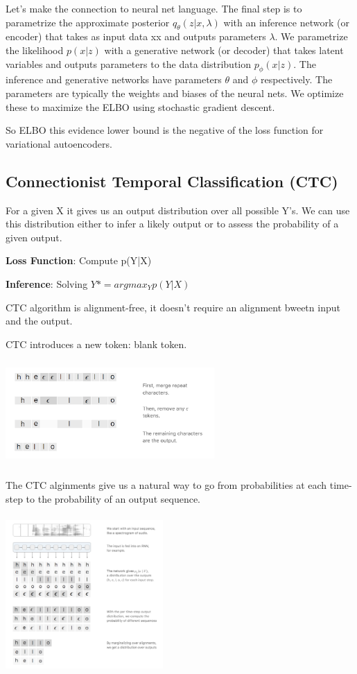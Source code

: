 \documentclass[a4paper]{article}
\begin{document}
Let’s make the connection to neural net language. The final step is to parametrize the approximate posterior $q_\theta (z | x, \lambda)$
 with an inference network (or encoder) that takes as input data xx and outputs parameters $\lambda$. We parametrize the likelihood $p(x |z)$ with a generative network (or decoder) that takes latent variables and outputs parameters to the data distribution $p_\phi(x|z)$. The inference and generative networks have parameters $\theta$ and $\phi$ respectively. The parameters are typically the weights and biases of the neural nets. We optimize these to maximize the ELBO using stochastic gradient descent.
 
 So ELBO this evidence lower bound is the negative of the loss function for variational autoencoders.

\subsection{Connectionist Temporal Classification (CTC)}

For a given X it gives us an output distribution over all possible Y's. We can use this distribution either to infer a likely output or to assess the probability of a given output.

{\bf Loss Function}: Compute p(Y|X)

{\bf Inference}: Solving $Y* = argmax_Y p(Y|X)$

CTC algorithm is alignment-free, it doesn't require an alignment bweetn input and the output. 

CTC introduces a new token: blank token. 

\begin{center}
\includegraphics[width=8cm, height=4cm]{blank.png}
\end{center}

The CTC alginments give us a natural way to go from probabilities at each time-step to the probability of an output sequence.

\begin{center}
\includegraphics[width=6cm, height=6cm]{ctc.png}
\end{center}
\end{document}

